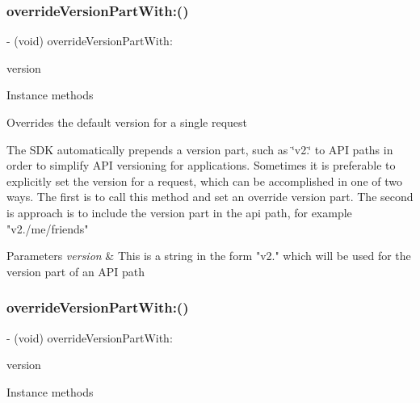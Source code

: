 \subsubsection{\texorpdfstring{override\+Version\+Part\+With\+:()}{overrideVersionPartWith:()}\hspace{0.1cm}{\footnotesize\ttfamily [1/5]}}
{\footnotesize\ttfamily -\/ (void) override\+Version\+Part\+With\+: \begin{DoxyParamCaption}\item[{(N\+S\+String $\ast$)}]{version }\end{DoxyParamCaption}}

Instance methods

Overrides the default version for a single request

The S\+DK automatically prepends a version part, such as \char`\"{}v2.\char`\"{} to A\+PI paths in order to simplify A\+PI versioning for applications. Sometimes it is preferable to explicitly set the version for a request, which can be accomplished in one of two ways. The first is to call this method and set an override version part. The second is approach is to include the version part in the api path, for example "v2./me/friends"


\begin{DoxyParams}{Parameters}
{\em version} & This is a string in the form "v2." which will be used for the version part of an A\+PI path \\
\hline
\end{DoxyParams}
\mbox{\label{interfaceFBRequest_a96f27df0edb3e41045bf5ba9ede2431c}} 
\subsubsection{\texorpdfstring{override\+Version\+Part\+With\+:()}{overrideVersionPartWith:()}\hspace{0.1cm}{\footnotesize\ttfamily [2/5]}}
{\footnotesize\ttfamily -\/ (void) override\+Version\+Part\+With\+: \begin{DoxyParamCaption}\item[{(N\+S\+String $\ast$)}]{version }\end{DoxyParamCaption}}

Instance methods

